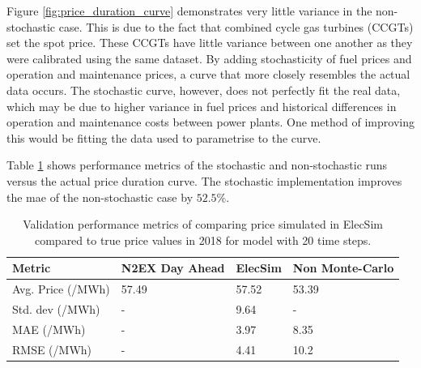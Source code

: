 Figure \ref{fig:price_duration_curve} demonstrates very little variance in the non-stochastic case. This is due to the fact that combined cycle gas turbines (CCGTs) set the spot price. These CCGTs have little variance between one another as they were calibrated using the same dataset. By adding stochasticity of fuel prices and operation and maintenance prices, a curve that more closely resembles the actual data occurs. The stochastic curve, however, does not perfectly fit the real data, which may be due to higher variance in fuel prices and historical differences in operation and maintenance costs between power plants. One method of improving this would be fitting the data used to parametrise to the curve.

Table \ref{table:validation_metrics} shows performance metrics of the stochastic and non-stochastic runs versus the actual price duration curve. The stochastic implementation improves the \acrfull{mae} of the non-stochastic case by $52.5\%$.

\begin{table}[]
	\begin{tabular}{p{4cm}p{4cm}p{2.5cm}p{3cm}}
		\hline
		Metric & N2EX Day Ahead & ElecSim & Non Monte-Carlo \\ \hline
		Avg. Price (\textsterling/MWh) & 57.49 & 57.52 & 53.39 \\
		Std. dev (\textsterling/MWh) & - & 9.64 & - \\
		MAE (\textsterling/MWh) & - & 3.97 & 8.35 \\
		RMSE (\textsterling/MWh) & - & 4.41 & 10.2 \\ \hline
	\end{tabular}
	\caption{Validation performance metrics of comparing price simulated in ElecSim compared to true price values in 2018 for model with 20 time steps.}
	\label{table:validation_metrics}
\end{table}






